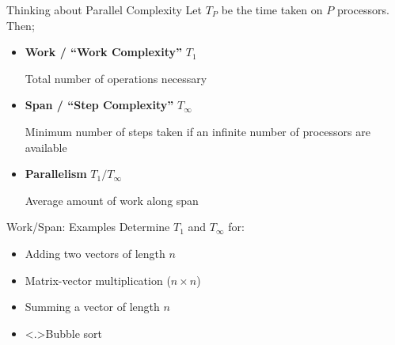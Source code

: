 \documentclass[english,compress]{beamer}
\begin{document}
\begin{frame}{Thinking about Parallel Complexity}
  Let $T_P$ be the time taken on $P$ processors. Then;
  \begin{itemize}
    \item \textbf{Work / ``Work Complexity''} $T_1$

      Total number of operations necessary
    \item \textbf{Span / ``Step Complexity''} $T_\infty$

      Minimum number of steps taken if an infinite number of processors are available
    \item \textbf{Parallelism} $T_1/T_\infty$

      Average amount of work along span
  \end{itemize}
  \uncover<+->{}
\end{frame}
\begin{frame}{Work/Span: Examples}
  Determine $T_1$ and $T_\infty$ for:

  \begin{itemize}[<+->]
    \item Adding two vectors of length $n$
    \item Matrix-vector multiplication ($n \times n$)
    \item Summing a vector of length $n$
    \item \strut\only<.>{Bubble sort}
  \end{itemize}
\end{frame}
\end{document}
